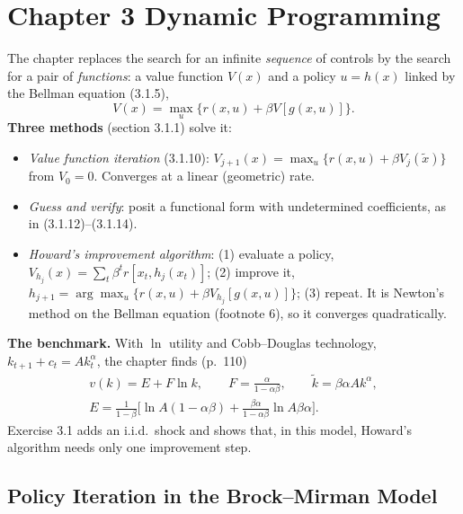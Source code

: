 \documentclass[12pt, letterpaper]{article}
\begin{document}
\section{Chapter 3 \quad Dynamic Programming}

\begin{tcolorbox}[theorybox,title={Chapter 3 Overview}]
The chapter replaces the search for an infinite \emph{sequence} of controls by the search
for a pair of \emph{functions}: a value function $V(x)$ and a policy $u=h(x)$ linked by the
Bellman equation (3.1.5),
\[
V(x)=\max_u\{r(x,u)+\beta V[g(x,u)]\}.
\]
\textbf{Three methods} (section 3.1.1) solve it:
\begin{itemize}[itemsep=1pt]
\item \emph{Value function iteration} (3.1.10): $V_{j+1}(x)=\max_u\{r(x,u)+\beta V_j(\tilde x)\}$
from $V_0=0$. Converges at a linear (geometric) rate.
\item \emph{Guess and verify}: posit a functional form with undetermined coefficients, as in
(3.1.12)--(3.1.14).
\item \emph{Howard's improvement algorithm}: (1) evaluate a policy,
$V_{h_j}(x)=\sum_t\beta^t r[x_t,h_j(x_t)]$; (2) improve it,
$h_{j+1}=\arg\max_u\{r(x,u)+\beta V_{h_j}[g(x,u)]\}$; (3) repeat. It is Newton's method on the
Bellman equation (footnote 6), so it converges quadratically.
\end{itemize}
\textbf{The benchmark.} With $\ln$ utility and Cobb--Douglas technology,
$k_{t+1}+c_t=Ak_t^\alpha$, the chapter finds (p.~110)
\begin{gather*}
v(k)=E+F\ln k,\qquad F=\frac{\alpha}{1-\alpha\beta},\qquad \tilde k=\beta\alpha Ak^\alpha,\\
E=\frac{1}{1-\beta}\Big[\ln A(1-\alpha\beta)+\frac{\beta\alpha}{1-\alpha\beta}\ln A\beta\alpha\Big].
\end{gather*}
Exercise 3.1 adds an i.i.d.\ shock and shows that, in this model, Howard's algorithm needs
only one improvement step.
\end{tcolorbox}

\subsection{Policy Iteration in the Brock--Mirman Model}
\end{document}
